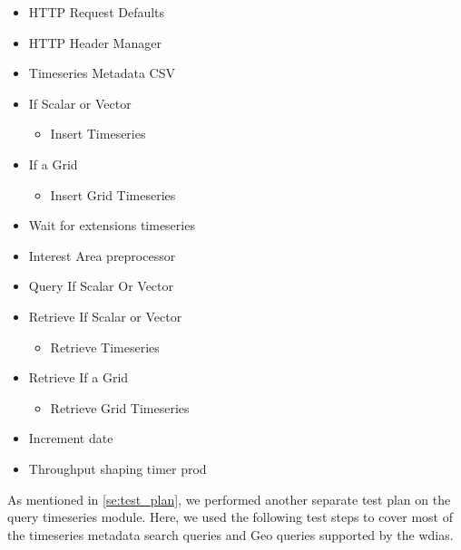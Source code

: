 \begin{itemize}
    \item HTTP Request Defaults
    \item HTTP Header Manager
    \item Timeseries Metadata CSV
    \item If Scalar or Vector
        \begin{itemize}
            \item Insert Timeseries
        \end{itemize}
    \item If a Grid
    \begin{itemize}
        \item Insert Grid Timeseries
    \end{itemize}
    \item Wait for extensions timeseries
    \item Interest Area preprocessor
    \item Query If Scalar Or Vector
    \item Retrieve If Scalar or Vector
        \begin{itemize}
            \item Retrieve Timeseries
        \end{itemize}
    \item Retrieve If a Grid
    \begin{itemize}
        \item Retrieve Grid Timeseries
    \end{itemize}
    \item Increment date
    \item Throughput shaping timer prod
\end{itemize}

As mentioned in \cref{se:test_plan}, we performed another separate test plan on the query timeseries module. Here, we used the following test steps to cover most of the timeseries metadata search queries and Geo queries supported by the \acrshort{wdias}.

